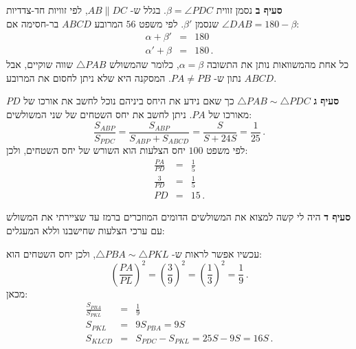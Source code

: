 \documentclass[12pt,a4paper]{article}
\begin{document}
\textbf{סעיף ב}
נסמן זווית
$\beta=\angle PDC$.
בגלל ש-%
$AB\|DC$,
לפי זוויות חד-צדדיות
$\angle DAB=180-\beta$
שנסמן
$\beta'$.
לפי משפט 
$56$
המרובע 
$ABCD$
בר-חסימה אם:
\begin{eqnarray*}
\alpha + \beta' &=& 180\\
\alpha' + \beta &=& 180\,.
\end{eqnarray*}
כל אחת מהמשוואות נותן את התשובה
$\alpha=\beta$,
כלומר שהמשולש
$\triangle PAB$
שווה שוקיים, אבל נתון ש-%
$PA\neq PB$.
המסקנה היא שלא ניתן לחסום את המרובע
$ABCD$.

\textbf{סעיף ג}
$\triangle PAB \sim \triangle PDC$
כך שאם נידע את היחס ביניהם נוכל לחשב את אורכו של
$PD$
מאורכו של
$PA$.
ניתן לחשב את יחס השטחים של שני המשולשים:
\[
\frac{S_{ABP}}{S_{PDC}} = \frac{S_{ABP}}{S_{ABP} + S_{ABCD}}=\frac{S}{S+24S}=\frac{1}{25}\,.
\]
לפי משפט 
$100$
יחס הצלעות הוא השורש של יחס השטחים, ולכן:
\begin{eqnarray*}
\frac{PA}{PD}&=&\frac{1}{5}\\
\frac{3}{PD}&=&\frac{1}{5}\\
PD&=&15\,.
\end{eqnarray*}

\textbf{סעיף ד}
היה לי קשה למצוא את המשולשים הדומים המוזכרים ברמז עד שציירתי את המשולש עם ערכי הצלעות שחישבנו וללא המעגלים:
\begin{center}
\end{center}
עכשיו אפשר לראות ש-%
$\triangle PBA \sim \triangle PKL$,
ולכן יחס השטחים הוא:
\[
\left(\frac{PA}{PL}\right)^2=\left(\frac{3}{9}\right)^2=\left(\frac{1}{3}\right)^2=\frac{1}{9}\,.
\]
מכאן:
\begin{eqnarray*}
\frac{S_{PBA}}{S_{PKL}}&=&\frac{1}{9}\\
S_{PKL}&=&9S_{PBA}=9S\\
S_{KLCD}&=&S_{PDC}-S_{PKL}=25S-9S=16S\,.
\end{eqnarray*}
\end{document}
